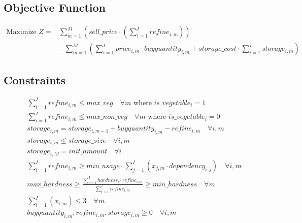 \documentclass{article}
\begin{document}
\subsection*{Objective Function}
\begin{align*}
    \text{Maximize } Z = & \sum_{m=1}^{M} \left( sell\_price \cdot ( \sum_{i=1}^{I} refine_{i,m}) \right) \\
    & - \sum_{m=1}^{M} \left( \sum_{i=1}^{I} price_{i,m} \cdot buyquantity_{i,m} + storage\_cost \cdot \sum_{i=1}^{I} storage_{i,m} \right)
\end{align*}

\subsection*{Constraints}
\begin{align*}
    & \sum_{i=1}^{I} refine_{i,m} \leq max\_veg \quad \forall m \text{ where } is\_vegetable_{i} = 1 \\
    & \sum_{i=1}^{I} refine_{i,m} \leq max\_non\_veg \quad \forall m \text{ where } is\_vegetable_{i} = 0 \\
    & storage_{i,m} = storage_{i,m-1} + buyquantity_{i,m} - refine_{i,m} \quad \forall i, m \\
    & storage_{i,m} \leq storage\_size \quad \forall i, m \\
    & storage_{i,M} = init\_amount \quad \forall i \\
    & \sum_{i=1}^{I} refine_{i,m} \geq min\_usage \cdot \sum_{j=1}^{I} (x_{j,m} \cdot dependency_{i,j}) \quad \forall i, m \\
    & max\_hardness \geq \frac{\sum_{i=1}^{I} hardness_{i} \cdot refine_{i,m}}{\sum_{i=1}^{I} refine_{i,m}} \geq min\_hardness \quad \forall m \\
    & \sum_{i=1}^{I} (x_{i,m}) \leq 3 \quad \forall m \\
    & buyquantity_{i,m}, refine_{i,m}, storage_{i,m} \geq 0 \quad \forall i, m \\
\end{align*}
\end{document}
